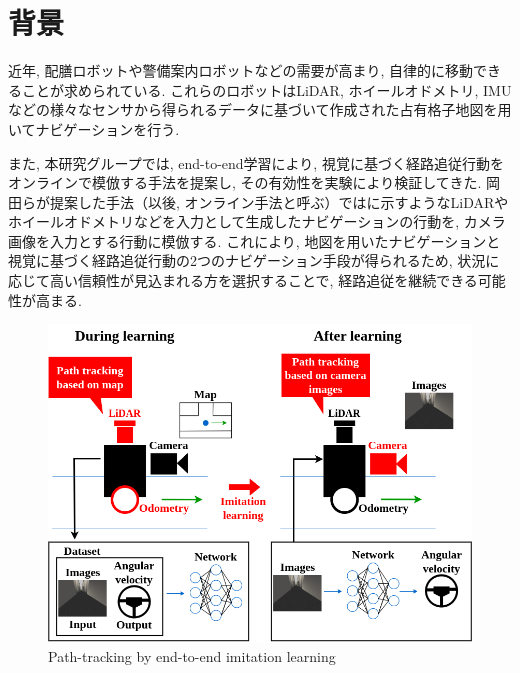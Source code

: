 
\section{背景}
近年, 配膳ロボットや警備案内ロボットなどの需要が高まり, 自律的に移動できることが求められている. これらのロボットはLiDAR, ホイールオドメトリ, IMUなどの様々なセンサから得られるデータに基づいて作成された占有格子地図を用いてナビゲーションを行う. \par また, 本研究グループでは, end-to-end学習により, 視覚に基づく経路追従行動をオンラインで模倣する手法を提案し, その有効性を実験により検証してきた. 岡田らが提案した手法（以後, オンライン手法と呼ぶ）ではに示すようなLiDARやホイールオドメトリなどを入力として生成したナビゲーションの行動を, カメラ画像を入力とする行動に模倣する\cite{okada-si2020}\cite{okada-si2021}. これにより, 地図を用いたナビゲーションと視覚に基づく経路追従行動の2つのナビゲーション手段が得られるため, 状況に応じて高い信頼性が見込まれる方を選択することで, 経路追従を継続できる可能性が高まる. 


\newpage
\begin{figure}[h]
     \centering
     \includegraphics[keepaspectratio, scale=0.3]
     {images/old.png}
     \caption{Path-tracking by end-to-end imitation learning}
     \label{Fig:old}
     \end{figure}

